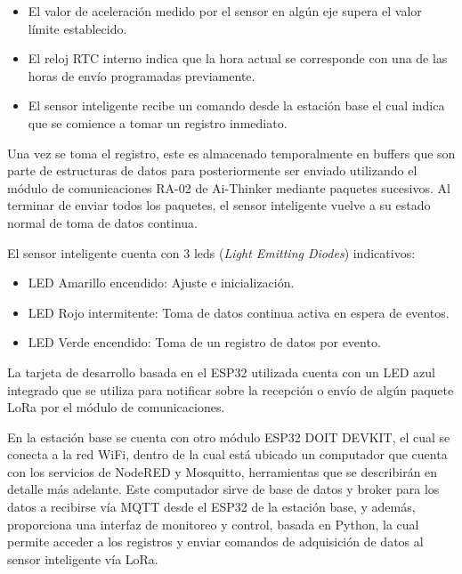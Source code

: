\begin{itemize}
    \item El valor de aceleración medido por el sensor en algún eje supera el valor límite establecido.
    \item El reloj RTC interno indica que la hora actual se corresponde con una de las horas de envío programadas previamente.
    \item El sensor inteligente recibe un comando desde la estación base el cual indica que se comience a tomar un registro inmediato.
\end{itemize}

Una vez se toma el registro, este es almacenado temporalmente en buffers que son parte de estructuras de datos para posteriormente ser enviado utilizando el módulo de comunicaciones RA-02 de Ai-Thinker mediante paquetes sucesivos. Al terminar de enviar todos los paquetes, el sensor inteligente vuelve a su estado normal de toma de datos continua.

El sensor inteligente cuenta con 3 leds (\textit{Light Emitting Diodes}) indicativos:

\begin{itemize}
    \item LED Amarillo encendido: Ajuste e inicialización.
    \item LED Rojo intermitente: Toma de datos continua activa en espera de eventos.
    \item LED Verde encendido: Toma de un registro de datos por evento.
    
\end{itemize}

La tarjeta de desarrollo basada en el ESP32 utilizada cuenta con un LED azul integrado que se utiliza para notificar sobre la recepción o envío de algún paquete LoRa por el módulo de comunicaciones.

En la estación base se cuenta con otro módulo ESP32 DOIT DEVKIT, el cual se conecta a la red WiFi, dentro de la cual está ubicado un computador que cuenta con los servicios de NodeRED y Mosquitto, herramientas que se describirán en detalle más adelante. Este computador sirve de base de datos y broker para los datos a recibirse vía MQTT desde el ESP32 de la estación base, y además, proporciona una interfaz de monitoreo y control, basada en Python, la cual permite acceder a los registros y enviar comandos de adquisición de datos al sensor inteligente vía LoRa. 

